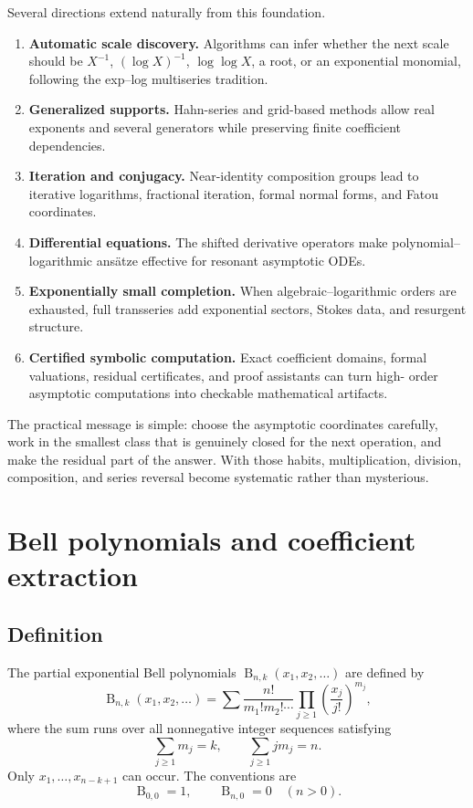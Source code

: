 \documentclass[11pt,openany]{book}
\theoremstyle{definition}
\theoremstyle{plain}
\theoremstyle{remark}
\newcommand{\Bell}{\operatorname{B}}
\begin{document}
Several directions extend naturally from this foundation.
\begin{enumerate}
\item \textbf{Automatic scale discovery.}  Algorithms can infer whether the
next scale should be \(X^{-1}\), \((\log X)^{-1}\), \(\log\log X\), a root, or
an exponential monomial, following the exp--log multiseries tradition.
\item \textbf{Generalized supports.}  Hahn-series and grid-based methods allow
real exponents and several generators while preserving finite coefficient
dependencies.
\item \textbf{Iteration and conjugacy.}  Near-identity composition groups lead
to iterative logarithms, fractional iteration, formal normal forms, and Fatou
coordinates.
\item \textbf{Differential equations.}  The shifted derivative operators make
polynomial--logarithmic ansätze effective for resonant asymptotic ODEs.
\item \textbf{Exponentially small completion.}  When algebraic--logarithmic
orders are exhausted, full transseries add exponential sectors, Stokes data,
and resurgent structure.
\item \textbf{Certified symbolic computation.}  Exact coefficient domains,
formal valuations, residual certificates, and proof assistants can turn high-
order asymptotic computations into checkable mathematical artifacts.
\end{enumerate}

The practical message is simple: choose the asymptotic coordinates carefully,
work in the smallest class that is genuinely closed for the next operation,
and make the residual part of the answer.  With those habits, multiplication,
division, composition, and series reversal become systematic rather than
mysterious.

\appendix

\chapter{Bell polynomials and coefficient extraction}\label{app:bell}

\section{Definition}
The partial exponential Bell polynomials
\(\Bell_{n,k}(x_1,x_2,\ldots)\) are defined by
\begin{equation}\label{eq:bell-definition}
 \Bell_{n,k}(x_1,x_2,\ldots)
 =\sum
 \frac{n!}{m_1!m_2!\cdots}
 \prod_{j\ge1}\left(\frac{x_j}{j!}\right)^{m_j},
\end{equation}
where the sum runs over all nonnegative integer sequences satisfying
\[
 \sum_{j\ge1}m_j=k,
 \qquad
 \sum_{j\ge1}jm_j=n.
\]
Only \(x_1,\ldots,x_{n-k+1}\) can occur.  The conventions are
\[
 \Bell_{0,0}=1,
 \qquad
 \Bell_{n,0}=0\quad(n>0).
\]
\end{document}
